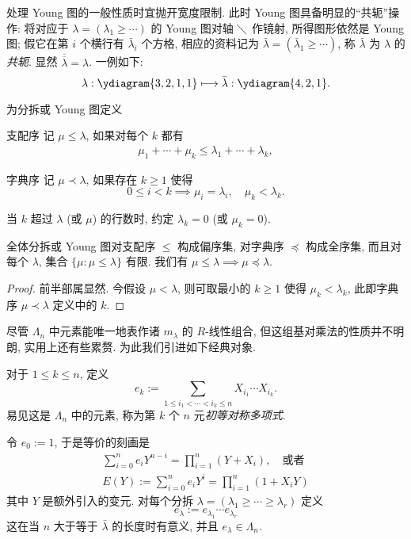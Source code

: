 处理 Young 图的一般性质时宜抛开宽度限制. 此时 Young 图具备明显的``共轭''操作: 将对应于 $\lambda = (\lambda_1 \geq \cdots)$ 的 Young 图对轴 $\diagdown$ 作镜射, 所得图形依然是 Young 图; 假它在第 $i$ 个横行有 $\bar{\lambda}_i$ 个方格, 相应的资料记为 $\bar{\lambda} = (\bar{\lambda}_1 \geq \cdots)$, 称 $\bar{\lambda}$ 为 $\lambda$ 的\emph{共轭}. 显然 $\overline{\overline{\lambda}} = \lambda$. 一例如下:
\[ \lambda: \ydiagram{3,2,1,1} \longmapsto \bar{\lambda}: \ydiagram{4,2,1}. \]

\begin{definition}
	为分拆或 Young 图定义
	\begin{compactdesc}
		\item[支配序] 记 $\mu \leq \lambda$, 如果对每个 $k$ 都有
			\begin{gather}\label{eqn:dominance-order}
				\mu_1 + \cdots + \mu_k \leq \lambda_1 + \cdots + \lambda_k,
			\end{gather}
		\item[字典序] 记 $\mu \prec \lambda$, 如果存在 $k \geq 1$ 使得
			\[0 \leq i < k \implies \mu_i = \lambda_i, \quad \mu_k < \lambda_k. \]
	\end{compactdesc}
	当 $k$ 超过 $\lambda$ (或 $\mu$) 的行数时, 约定 $\lambda_k=0$ (或 $\mu_k=0$).
\end{definition}

\begin{proposition}\label{prop:dominance-lex-order}
	全体分拆或 Young 图对支配序 $\leq$ 构成偏序集, 对字典序 $\preceq$ 构成全序集, 而且对每个 $\lambda$, 集合 $\{\mu: \mu \leq \lambda \}$ 有限. 我们有 $\mu \leq \lambda \implies \mu \preceq \lambda$.
\end{proposition}
\begin{proof}
	前半部属显然. 今假设 $\mu < \lambda$, 则可取最小的 $k \geq 1$ 使得 $\mu_k < \lambda_k$, 此即字典序 $\mu \prec \lambda$ 定义中的 $k$.
\end{proof}

尽管 $\Lambda_n$ 中元素能唯一地表作诸 $m_\lambda$ 的 $R$-线性组合, 但这组基对乘法的性质并不明朗, 实用上还有些累赘. 为此我们引进如下经典对象.
\begin{definition}[初等对称多项式]\label{def:elementary-symm-poly}
	对于 $1 \leq k \leq n$, 定义
	\[ e_k := \sum_{1 \leq i_1 < \cdots < i_k \leq n} X_{i_1} \cdots X_{i_k}. \]
	易见这是 $\Lambda_n$ 中的元素, 称为第 $k$ 个 $n$ 元\emph{初等对称多项式}.
\end{definition}
令 $e_0 := 1$, 于是等价的刻画是
\begin{gather*}
	\sum_{i=0}^n e_i Y^{n-i} = \prod_{i=1}^n (Y + X_i), \quad \text{或者} \\
	E(Y) := \sum_{i=0}^n e_i Y^i = \prod_{i=1}^n (1 + X_i Y)
\end{gather*}
其中 $Y$ 是额外引入的变元. 对每个分拆 $\lambda = (\lambda_1 \geq \cdots \geq \lambda_r)$ 定义
\[ e_\lambda := e_{\lambda_1} \cdots e_{\lambda_r} \]
这在当 $n$ 大于等于 $\bar{\lambda}$ 的长度时有意义, 并且 $e_\lambda \in \Lambda_n$.

